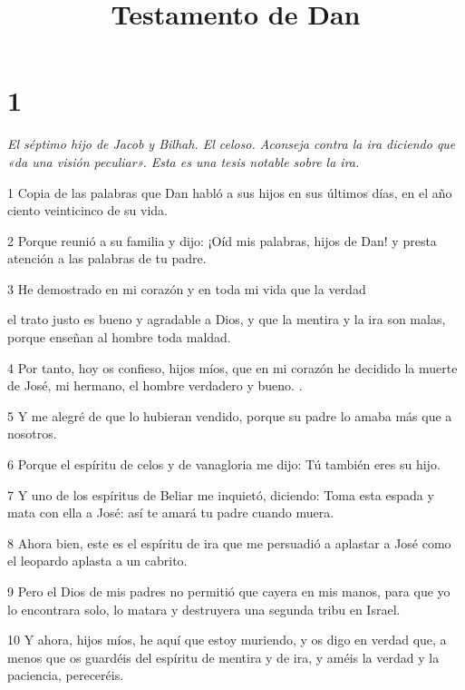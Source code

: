 

\title{Testamento de Dan}

\chapter{1}

\par \textit{El séptimo hijo de Jacob y Bilhah. El celoso. Aconseja contra la ira diciendo que «da una visión peculiar». Esta es una tesis notable sobre la ira.}

\par 1 Copia de las palabras que Dan habló a sus hijos en sus últimos días, en el año ciento veinticinco de su vida.

\par 2 Porque reunió a su familia y dijo: ¡Oíd mis palabras, hijos de Dan! y presta atención a las palabras de tu padre.

\par 3 He demostrado en mi corazón y en toda mi vida que la verdad

el trato justo es bueno y agradable a Dios, y que la mentira y la ira son malas, porque enseñan al hombre toda maldad.

\par 4 Por tanto, hoy os confieso, hijos míos, que en mi corazón he decidido la muerte de José, mi hermano, el hombre verdadero y bueno. .

\par 5 Y me alegré de que lo hubieran vendido, porque su padre lo amaba más que a nosotros.

\par 6 Porque el espíritu de celos y de vanagloria me dijo: Tú también eres su hijo.

\par 7 Y uno de los espíritus de Beliar me inquietó, diciendo: Toma esta espada y mata con ella a José: así te amará tu padre cuando muera.

\par 8 Ahora bien, este es el espíritu de ira que me persuadió a aplastar a José como el leopardo aplasta a un cabrito.

\par 9 Pero el Dios de mis padres no permitió que cayera en mis manos, para que yo lo encontrara solo, lo matara y destruyera una segunda tribu en Israel.

\par 10 Y ahora, hijos míos, he aquí que estoy muriendo, y os digo en verdad que, a menos que os guardéis del espíritu de mentira y de ira, y améis la verdad y la paciencia, pereceréis.

